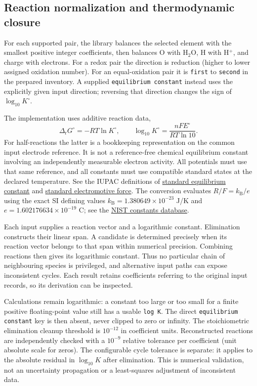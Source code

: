 \documentclass[a4paper,11pt]{ltxdoc}
\begin{document}
\subsection{Reaction normalization and thermodynamic closure}
For each supported pair, the library balances the selected element with the
smallest positive integer coefficients, then balances O with H$_2$O, H with
H$^+$, and charge with electrons. For a redox pair the direction is reduction
(higher to lower assigned oxidation number). For an equal-oxidation pair it is
\texttt{first} to \texttt{second} in the prepared inventory. A supplied
\texttt{equilibrium constant} instead uses the explicitly given input direction;
reversing that direction changes the sign of $\log_{10}K^\circ$.

The implementation uses additive reaction data,
\[
 \Delta_{\mathrm r}G^\circ=-RT\ln K^\circ,
 \qquad
 \log_{10}K^\circ=\frac{nFE^\circ}{RT\ln 10}.
\]
For half-reactions the latter is a bookkeeping representation on the common
input electrode reference. It is not a reference-free chemical equilibrium
constant involving an independently measurable electron activity. All potentials
must use that same reference, and all constants must use compatible standard
states at the declared temperature. See the IUPAC definitions of
\href{https://goldbook.iupac.org/terms/view/S05915}{standard equilibrium constant}
and \href{https://goldbook.iupac.org/terms/view/S05913}{standard electromotive force}.
The conversion evaluates $R/F=k_{\mathrm B}/e$ using the exact SI defining values
$k_{\mathrm B}=1.380649\times10^{-23}$ J/K and
$e=1.602176634\times10^{-19}$ C; see the
\href{https://physics.nist.gov/cuu/Constants/index.html}{NIST constants database}.

Each input supplies a reaction vector and a logarithmic constant. Elimination
constructs their linear span. A candidate is determined precisely when its
reaction vector belongs to that span within numerical precision. Combining
reactions then gives its logarithmic constant. Thus no particular chain of
neighbouring species is privileged, and alternative input paths can expose
inconsistent cycles. Each result retains coefficients referring to the original
input records, so its derivation can be inspected.

Calculations remain logarithmic: a constant too large or too small for a finite
positive floating-point value still has a usable \texttt{log K}. The direct
\texttt{equilibrium constant} key is then absent, never clipped to zero or infinity.
The stoichiometric elimination cleanup threshold is $10^{-12}$ in coefficient
units. Reconstructed reactions are independently checked with a $10^{-9}$
relative tolerance per coefficient (unit absolute scale for zeros).
The configurable cycle tolerance is separate: it applies to the absolute
residual in $\log_{10}K$ after elimination. This is numerical validation, not an
uncertainty propagation or a least-squares adjustment of inconsistent data.
\end{document}
